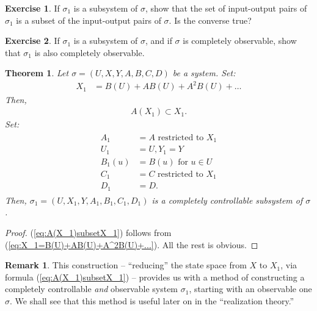 \documentclass[12pt]{book}
\theoremstyle{plain}
\newtheorem{theorem}{Theorem}[section]
\theoremstyle{definition}
\newtheorem{exercise}{Exercise}[section]
\newtheorem*{remark}{Remark}
\begin{document}
\begin{exercise}
    If $\sigma_1$ is a subsystem of $\sigma$, show that the set of input-output pairs of $\sigma_1$ is a subset of the input-output pairs of $\sigma$.
    Is the converse true?
\end{exercise}

\begin{exercise}
    If $\sigma_1$ is a subsystem of $\sigma$, and if $\sigma$ is completely observable, show that $\sigma_1$ is also completely observable.
\end{exercise}

\begin{theorem} \label{thm:CompletelyControllableSubsystem}
    Let $\sigma = (U, X, Y, A, B, C, D)$ be a system.
    Set:
    \begin{align} \label{eq:X_1=B(U)+AB(U)+A^2B(U)+...}
        X_1 &= B(U) + AB(U) + A^2B(U) + \dots
    \end{align}
    Then,
    \begin{align} \label{eq:A(X_1)subsetX_1}
        A(X_1) \subset X_1.
    \end{align}
    Set:
    \begin{align*}
    \begin{split}
        A_1 &= A \text{ restricted to } X_1 \\
        U_1 &= U, Y_1 = Y \\
        B_1(u) &= B(u) \text{ for } u \in U \\
        C_1 &= C \text{ restricted to } X_1 \\
        D_1 &= D.
    \end{split}
    \end{align*}
    Then, $\sigma_1 = (U, X_1, Y, A_1, B_1, C_1, D_1)$ is a completely controllable subsystem of $\sigma$.
\end{theorem}

\begin{proof}
    (\ref{eq:A(X_1)subsetX_1}) follows from (\ref{eq:X_1=B(U)+AB(U)+A^2B(U)+...}).
    All the rest is obvious.
\end{proof}

\begin{remark}
    This construction -- ``reducing'' the state space from $X$ to $X_1$, via formula (\ref{eq:A(X_1)subsetX_1}) -- provides us with a method of constructing a completely controllable \emph{and} observable system $\sigma_1$, starting with an observable one $\sigma$.
    We shall see that this method is useful later on in the ``realization theory.''
\end{remark}
\end{document}
